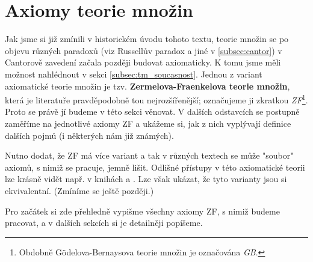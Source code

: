 \chapter{Axiomy teorie množin}\label{chap:axiomy_tm}
Jak jsme si již zmínili v historickém úvodu tohoto textu, teorie množin se po objevu různých paradoxů (viz Russellův paradox a jiné v \ref{subsec:cantor}) v Cantorově zavedení začala později budovat axiomaticky. K tomu jsme měli možnost nahlédnout v sekci \ref{subsec:tm_soucasnost}. Jednou z variant axiomatické teorie množin je tzv. \textbf{Zermelova-Fraenkelova teorie množin}, která je literatuře pravděpodobně tou nejrozšířenější; označujeme ji zkratkou \emph{\textsf{ZF}}\footnote{Obdobně Gödelova-Bernaysova teorie množin je označována \emph{\textsf{GB}}.}. Proto se právě jí budeme v této sekci věnovat. V dalších odstavcích se postupně zaměříme na jednotlivé axiomy \textsf{ZF} a ukážeme si, jak z nich vyplývají definice dalších pojmů (i některých nám již známých).\par
Nutno dodat, že \textsf{ZF} má více variant a tak v různých textech se může "soubor" axiomů, s nimiž se pracuje, jemně lišit. Odlišné přístupy v této axiomatické teorii lze krásně vidět např. v knihách \cite{BalcarStepanek1986} a \cite{Goldrei2017}. Lze však ukázat, že tyto varianty jsou si ekvivalentní. (Zmíníme se ještě později.)\par
Pro začátek si zde přehledně vypišme všechny axiomy \textsf{ZF}, s nimiž budeme pracovat, a v dalších sekcích si je detailněji popíšeme.
\medskip

